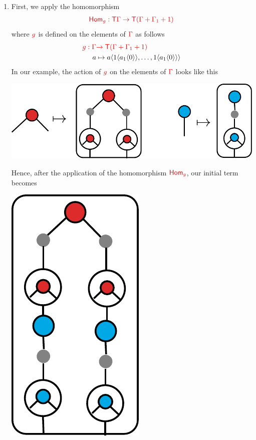 \begin{example}
\begin{center}
		\end{center}
\begin{enumerate}
\item  First, we apply the homomorphism 
\begin{align*}
{\color{red}{\mathsf{Hom}_g:{\color{red}{\mathsf T}}\Gamma\to {\color{red}{\mathsf T}}(\Gamma+\Gamma_1+1)}}
\end{align*}
where ${\color{red}{g}}$ is defined on the elements of ${\color{red}{\Gamma}}$ as follows
\begin{align*}
{\color{red}{g: \Gamma}} & {\color{red}{\to  {\color{red}{\mathsf T}}(\Gamma+\Gamma_1+1 )}}\\
      a & \mapsto a\langle{1\langle{a_1\langle{0}\rangle}\rangle,\dots, 1\langle{a_1\langle{0}\rangle}\rangle}\rangle
\end{align*}
In our example, the action of ${\color{red}{g}}$ on the elements of ${\color{red}{\Gamma}}$ looks like this
\begin{center}
		\includegraphics[scale=.4]{parent-function-g.pdf}
				\end{center}
Hence, after the application of the homomorphism ${\color{red}{\mathsf{Hom}_g}}$, our initial term becomes
\begin{center}
		\includegraphics[scale=.4]{parent-hom.pdf}

\end{center}
\end{enumerate}
\end{example}
